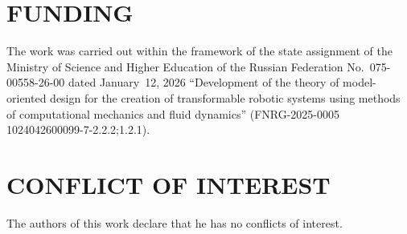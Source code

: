 \documentclass[12pt]{revtex4}
\begin{document}
\section*{FUNDING}
\noindent
The work was carried out within the framework of the state assignment of the Ministry of Science and Higher Education of the Russian Federation No.~075-00558-26-00 dated January~12, 2026 ``Development of the theory of model-oriented design for the creation of transformable robotic systems using methods of computational mechanics and fluid dynamics'' (FNRG-2025-0005 1024042600099-7-2.2.2;1.2.1).

\section*{CONFLICT OF INTEREST}
\noindent
The authors of this work declare that he has no conflicts of interest.
\end{document}
